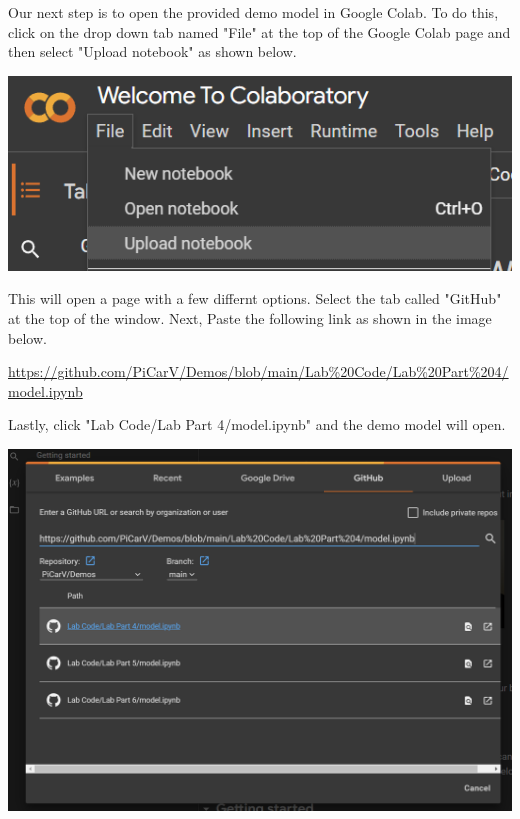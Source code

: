 \documentclass[11pt]{report}
\begin{document}
Our next step is to open the provided demo model in Google Colab. To do this, click on the drop down tab named "File" at the top of the Google Colab page and then select "Upload notebook" as shown below.

\begin{center}
    \includegraphics[scale=0.6]{creataproject.png}
\end{center}

This will open a page with a few differnt options. Select the tab called "GitHub" at the top of the window. Next, Paste the following link as shown in the image below.\newline

\url{https://github.com/PiCarV/Demos/blob/main/Lab%20Code/Lab%20Part%204/model.ipynb} \newline

Lastly, click "Lab Code/Lab Part 4/model.ipynb" and the demo model will open.

\begin{center}
    \includegraphics[scale=0.4]{openmodel.png}
\end{center}
\end{document}
